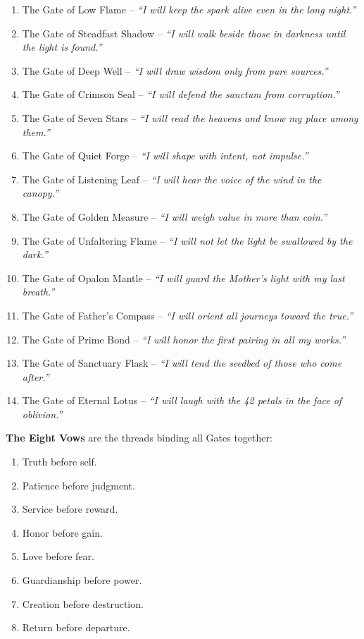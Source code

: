 \begin{enumerate}[label=\textbf{Gate \arabic*:}, leftmargin=3em]
\item The Gate of Low Flame – \textit{“I will keep the spark alive even in the long night.”}
\item The Gate of Steadfast Shadow – \textit{“I will walk beside those in darkness until the light is found.”}
\item The Gate of Deep Well – \textit{“I will draw wisdom only from pure sources.”}
\item The Gate of Crimson Seal – \textit{“I will defend the sanctum from corruption.”}
\item The Gate of Seven Stars – \textit{“I will read the heavens and know my place among them.”}
\item The Gate of Quiet Forge – \textit{“I will shape with intent, not impulse.”}
\item The Gate of Listening Leaf – \textit{“I will hear the voice of the wind in the canopy.”}
\item The Gate of Golden Measure – \textit{“I will weigh value in more than coin.”}
\item The Gate of Unfaltering Flame – \textit{“I will not let the light be swallowed by the dark.”}

\item The Gate of Opalon Mantle – \textit{“I will guard the Mother’s light with my last breath.”}
\item The Gate of Father’s Compass – \textit{“I will orient all journeys toward the true.”}
\item The Gate of Prime Bond – \textit{“I will honor the first pairing in all my works.”}
\item The Gate of Sanctuary Flask – \textit{“I will tend the seedbed of those who come after.”}
\item The Gate of Eternal Lotus – \textit{“I will laugh with the 42 petals in the face of oblivion.”}

\end{enumerate}

\vspace{1em}
\noindent
\textbf{The Eight Vows} are the threads binding all Gates together:

\begin{enumerate}[label=\Roman*.]
\item Truth before self.
\item Patience before judgment.
\item Service before reward.
\item Honor before gain.
\item Love before fear.
\item Guardianship before power.
\item Creation before destruction.
\item Return before departure.
\end{enumerate}

